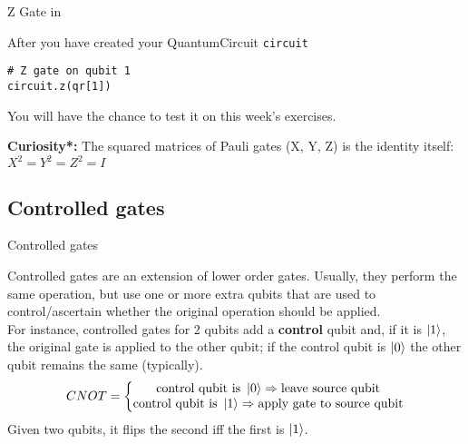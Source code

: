 \documentclass[aspectratio=43]{beamer}
\begin{document}
\begin{frame}[fragile]{Z Gate in \qk}
\begin{card}
    After you have created your QuantumCircuit \texttt{circuit}
    \begin{verbatim}
# Z gate on qubit 1
circuit.z(qr[1])
    \end{verbatim}
    \begin{center}
        
    \end{center}
    You will have the chance to test it on this week's exercises.
\end{card}
\begin{cardTiny}
    \textbf{Curiosity*: } The squared matrices of Pauli gates (X, Y, Z) is the identity itself: $X^2 = Y^2 = Z^2 = I$
\end{cardTiny}
\end{frame}



\subsection{Controlled gates}
\begin{frame}{Controlled gates}
\begin{card}
    Controlled gates are an extension of lower order gates. Usually, they perform the same operation, but use one or more extra qubits that are used to control/ascertain whether the original operation should be applied.\\
    For instance, controlled gates for 2 qubits add a \textbf{control} qubit and, if it is $\ket{1}$, the original gate is applied to the other qubit; if the control qubit is $\ket{0}$ the other qubit remains the same (typically).\\
    \begin{equation*}
        CNOT = \left\{\begin{matrix}
            \text{control qubit is } \ket{0} \Rightarrow \text{leave source qubit} \\ 
            \text{control qubit is } \ket{1} \Rightarrow \text{apply gate to source qubit}
        \end{matrix}\right.
    \end{equation*}
    Given two qubits, it flips the second iff the first is $\ket{1}$.
\end{card}
\pagenumber
\end{frame}
\end{document}
